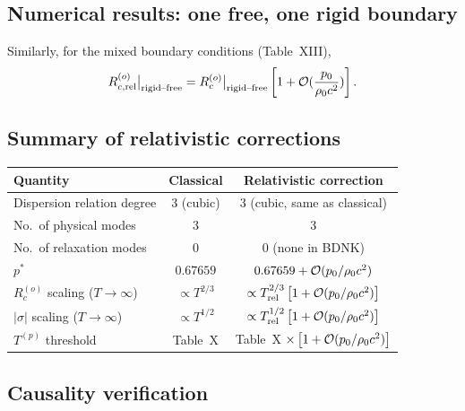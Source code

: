 \subsection{Numerical results: one free, one rigid boundary}

Similarly, for the mixed boundary conditions (Table~XIII),
\begin{equation}\label{eq:rel-3-Rc-mixed}
  R_{c,\mathrm{rel}}^{(o)}\big|_{\text{rigid--free}}
  = R_{c}^{(o)}\big|_{\text{rigid--free}}
    \left[1 + \mathcal{O}(\frac{p_{0}}{\rho_0 c^{2}})\right].
\end{equation}

\subsection{Summary of relativistic corrections}

\begin{center}
\begin{tabular}{lcc}
\hline
Quantity & Classical & Relativistic correction \\
\hline
Dispersion relation degree & 3 (cubic) & 3 (cubic, same as classical) \\
No.\ of physical modes & 3 & 3 \\
No.\ of relaxation modes & 0 & 0 (none in BDNK) \\
$p^{*}$ & $0.67659$ & $0.67659 + \mathcal{O}(p_{0}/\rho_0 c^{2})$ \\
$R_{c}^{(o)}$ scaling ($T\to\infty$)
  & $\propto T^{2/3}$
  & $\propto T_{\mathrm{rel}}^{2/3}\left[1 + \mathcal{O}(p_{0}/\rho_0 c^{2})\right]$ \\
$|\sigma|$ scaling ($T\to\infty$)
  & $\propto T^{1/2}$
  & $\propto T_{\mathrm{rel}}^{1/2}\left[1 + \mathcal{O}(p_{0}/\rho_0 c^{2})\right]$ \\
$T^{(p)}$ threshold & Table~X
  & Table~X$\;\times\left[1 + \mathcal{O}(p_{0}/\rho_0 c^{2})\right]$ \\
\hline
\end{tabular}
\end{center}


\subsection*{Causality verification}

